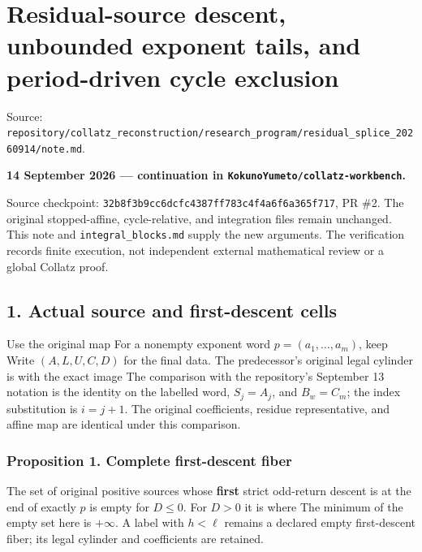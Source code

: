 \chapter{Residual-source descent, unbounded exponent tails, and
period-driven cycle exclusion}
{\small\sffamily Source: \nolinkurl{repository/collatz_reconstruction/research_program/residual_splice_20260914/note.md}.\par}


\textbf{14 September 2026 --- continuation in
\nolinkurl{KokunoYumeto/collatz-workbench}.}

Source checkpoint: \nolinkurl{32b8f3b9cc6dcfc4387ff783c4f4a6f6a365f717},
PR \#2. The original stopped-affine, cycle-relative, and integration
files remain unchanged. This note and \nolinkurl{integral_blocks.md}
supply the new arguments. The verification records finite execution, not
independent external mathematical review or a global Collatz proof.

\section{1. Actual source and first-descent cells}

Use the original map
For a nonempty exponent word \(p=(a_1,\ldots,a_m)\), keep
 Write
\((A,L,U,C,D)\) for the final data. The predecessor's original legal
cylinder is  with the exact image
 The comparison with the
repository's September 13 notation is the identity on the labelled word,
\(S_j=A_j\), and \(B_w=C_m\); the index substitution is \(i=j+1\). The
original coefficients, residue representative, and affine map are
identical under this comparison.

\subsection{Proposition 1. Complete first-descent fiber}

The set of original positive sources whose \textbf{first} strict
odd-return descent is at the end of exactly \(p\) is empty for
\(D\le0\). For \(D>0\) it is
 where
 The minimum
of the empty set here is \(+\infty\). A label with \(h<\ell\) remains a
declared empty first-descent fiber; its legal cylinder and coefficients
are retained.

